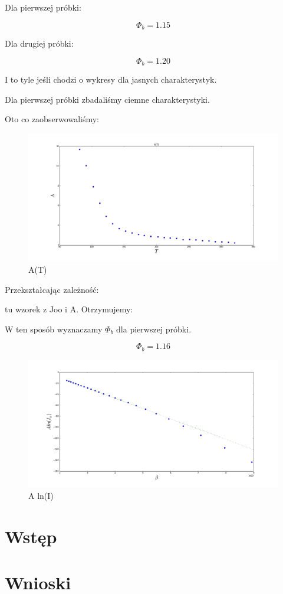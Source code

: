 \documentclass[a4paper,12pt]{article}
\begin{document}
Dla pierwszej próbki:

$$\Phi_b = 1.15$$

Dla drugiej próbki:

$$\Phi_b = 1.20$$

I to tyle jeśli chodzi o wykresy dla jasnych charakterystyk.

Dla pierwszej próbki zbadaliśmy ciemne charakterystyki.

Oto co zaobserwowaliśmy:
\begin{figure} [H]
  \begin{center}
    \includegraphics[width = 15cm]{A_T.png}
    \caption{A(T)}
  \end{center}
\end{figure}

Przekształcając zależność:

tu wzorek z Joo i A. Otrzymujemy:

W ten sposób wyznaczamy $\Phi_b$ dla pierwszej próbki.


$$\Phi_b = 1.16$$

\begin{figure} [H]
  \begin{center}
    \includegraphics[width = 15cm]{A_lnI.png}
    \caption{A ln(I)}
  \end{center}
\end{figure}
\section{Wstęp}

\section{Wnioski}
\end{document}
